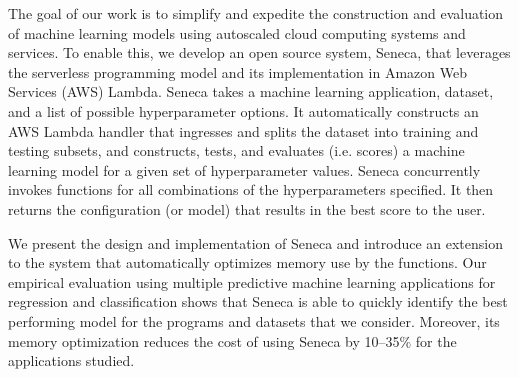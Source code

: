 The goal of our work is to simplify and expedite the 
construction and evaluation of machine learning models 
using autoscaled cloud computing systems and services.
To enable this, we develop an open source system, Seneca, that leverages
the serverless programming model and its implementation in Amazon Web Services
(AWS) Lambda.  
Seneca takes a machine learning application, dataset, and a list of 
possible hyperparameter options.  It automatically constructs an AWS Lambda
handler that ingresses and splits the dataset into training
and testing subsets, and constructs, tests, and evaluates (i.e. scores) a machine
learning model for a given set of hyperparameter values.  Seneca concurrently invokes
functions for all combinations of the hyperparameters specified.
It then returns the configuration (or model) that results in the best score 
to the user.  

We present the design and implementation of Seneca and introduce an extension to the
system that automatically optimizes memory use by the functions.  
Our empirical evaluation using multiple predictive machine learning applications 
for regression and classification shows that Seneca is able to quickly
identify the best performing model for the programs and datasets that we consider.
Moreover, its memory optimization reduces the cost of using Seneca 
by 10--35\% for the applications studied.

